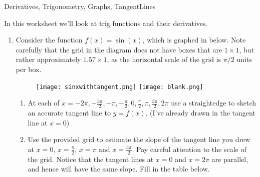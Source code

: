 
\begin{tagblock}{Derivatives, Trigonometry, Graphs, TangentLines}
\begin{question}
	






 In this worksheet we'll look at trig functions and their derivatives.  

\begin{enumerate}

\item Consider the function $f(x)=\sin(x)$, which is graphed in below. Note carefully that the grid in the diagram does not have boxes that are $1\times 1$, but rather approximately $1.57 \times 1$, as the horizontal scale of the grid is $\pi/2$ units per box. 

\begin{figure}[h]
\texttt{[image: sinxwithtangent.png]} \hfill \texttt{[image: blank.png]}

\end{figure}
\begin{enumerate}
\item At each of $x=-2 \pi, -\frac{3\pi}{2}, - \pi, -\frac{\pi}{2}, 0, \frac{\pi}{2}, \pi, \frac{3\pi}{2}, 2\pi$ use a straightedge to sketch an accurate tangent line to $y=f(x)$.  (I've already drawn in the tangent line at $x=0$) 

\item Use the provided grid to estimate the slope of the tangent line you drew at $x= 0$, $x=\frac{\pi}{2}$, $x=\pi$ and $x=\frac{3 \pi}{2}$. Pay careful attention to the scale of the grid.  Notice that the tangent lines at $x=0$ and $x=2\pi$ are parallel, and hence will have the same slope.  Fill in the table below.  

\bigskip


\end{enumerate}
\end{enumerate}
\end{question}
\end{tagblock}
